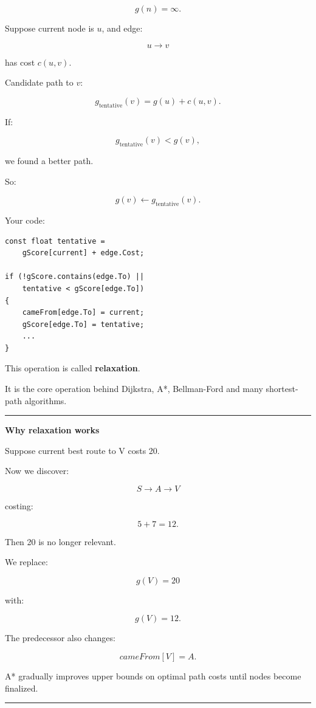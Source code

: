 \[
g(n)=\infty.
\]

Suppose current node is \(u\), and edge:

\[
u\rightarrow v
\]

has cost \(c(u,v)\).

Candidate path to \(v\):

\[
g_{\text{tentative}}(v)
=
g(u)+c(u,v).
\]

If:

\[
g_{\text{tentative}}(v)<g(v),
\]

we found a better path.

So:

\[
g(v)
\leftarrow
g_{\text{tentative}}(v).
\]

Your code:

\begin{verbatim}
const float tentative =
    gScore[current] + edge.Cost;

if (!gScore.contains(edge.To) ||
    tentative < gScore[edge.To])
{
    cameFrom[edge.To] = current;
    gScore[edge.To] = tentative;
    ...
}
\end{verbatim}

This operation is called \textbf{relaxation}.

It is the core operation behind Dijkstra, A*, Bellman-Ford and many shortest-path algorithms.

\begin{center}\rule{0.5\linewidth}{0.5pt}\end{center}

\textbf{Why relaxation works}

Suppose current best route to V costs 20.

Now we discover:

\[
S\rightarrow A\rightarrow V
\]

costing:

\[
5+7=12.
\]

Then 20 is no longer relevant.

We replace:

\[
g(V)=20
\]

with:

\[
g(V)=12.
\]

The predecessor also changes:

\[
cameFrom[V]=A.
\]

A* gradually improves upper bounds on optimal path costs until nodes become finalized.

\begin{center}\rule{0.5\linewidth}{0.5pt}\end{center}

